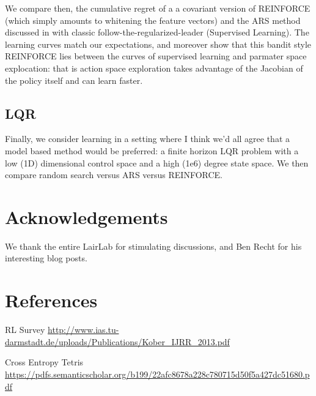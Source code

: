 \documentclass{article}
\begin{document}
We compare then, the cumulative regret of a a covariant version of REINFORCE (which simply amounts to whitening the feature vectors) and the ARS method discussed in \cite{Mania} with
classic follow-the-regularized-leader (Supervised Learning). The learning curves match our expectations, and moreover show that this bandit style REINFORCE lies between the curves of supervised learning and parmater space explocation: that is action space exploration takes advantage of the Jacobian of the policy itself and can learn faster. 



\subsection{LQR}

Finally, we consider learning in a setting where I think we'd all agree that a model based method would be preferred: a finite horizon LQR problem with a low (1D) dimensional control space
and a high (1e6) degree state space. We then compare random search versus ARS versus REINFORCE.


\section{Acknowledgements}

We thank the entire LairLab for stimulating discussions, and Ben Recht for his interesting blog posts.

\section{References}

RL Survey
\url{http://www.ias.tu-darmstadt.de/uploads/Publications/Kober_IJRR_2013.pdf}

Cross Entropy Tetris
\url{https://pdfs.semanticscholar.org/b199/22afc8678a228c780715d50f5a427dc51680.pdf}
\end{document}
